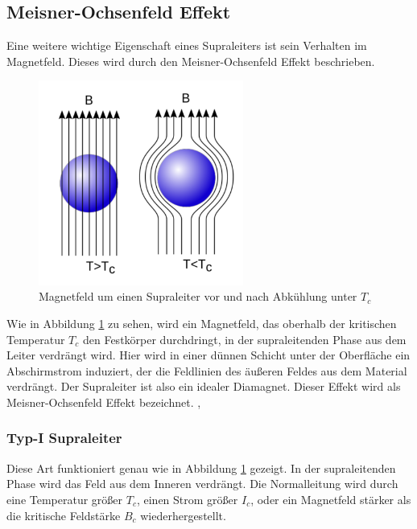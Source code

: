 	\subsection{Meisner-Ochsenfeld Effekt}
Eine weitere wichtige Eigenschaft eines Supraleiters ist sein Verhalten im 
Magnetfeld. Dieses wird durch den Meisner-Ochsenfeld Effekt beschrieben.
\begin{figure}[h]
	\centering
	\includegraphics[width=0.6\textwidth]{Abb/meisner.pdf}
	\caption{Magnetfeld um einen Supraleiter vor und nach Abkühlung unter $T_c$ 
	\cite{meisnerwiki}}
	\label{Abb:meisner}
\end{figure}
Wie in Abbildung \ref{Abb:meisner} zu sehen, wird ein Magnetfeld, das oberhalb der
kritischen Temperatur $T_c$ den Festkörper durchdringt, in der supraleitenden Phase
aus dem Leiter verdrängt wird. Hier wird in einer dünnen Schicht unter der 
Oberfläche ein Abschirmstrom induziert, der die Feldlinien des äußeren Feldes aus
dem Material verdrängt. Der Supraleiter ist also ein idealer Diamagnet. Dieser 
Effekt wird als Meisner-Ochsenfeld Effekt bezeichnet. \cite{hunklinger}, 
\cite{meisnerwiki}

		\subsubsection{Typ-I Supraleiter}
Diese Art funktioniert genau wie in Abbildung \ref{Abb:meisner} gezeigt. In der 
supraleitenden Phase wird das Feld aus dem Inneren verdrängt. Die Normalleitung 
wird durch eine Temperatur größer $T_c$, einen Strom größer $I_c$, oder ein
Magnetfeld stärker als die kritische Feldstärke $B_c$ wiederhergestellt. 
\cite{hunklinger}

